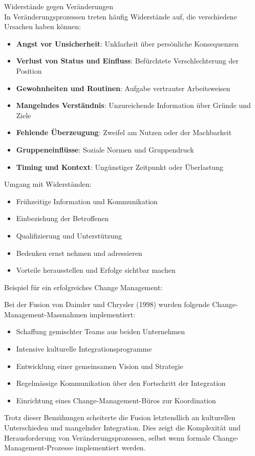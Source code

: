 \begin{concept}{Widerstände gegen Veränderungen}\\
In Veränderungsprozessen treten häufig Widerstände auf, die verschiedene Ursachen haben können:
\begin{itemize}
    \item \textbf{Angst vor Unsicherheit}: Unklarheit über persönliche Konsequenzen
    \item \textbf{Verlust von Status und Einfluss}: Befürchtete Verschlechterung der Position
    \item \textbf{Gewohnheiten und Routinen}: Aufgabe vertrauter Arbeitsweisen
    \item \textbf{Mangelndes Verständnis}: Unzureichende Information über Gründe und Ziele
    \item \textbf{Fehlende Überzeugung}: Zweifel am Nutzen oder der Machbarkeit
    \item \textbf{Gruppeneinflüsse}: Soziale Normen und Gruppendruck
    \item \textbf{Timing und Kontext}: Ungünstiger Zeitpunkt oder Überlastung
\end{itemize}

Umgang mit Widerständen:
\begin{itemize}
    \item Frühzeitige Information und Kommunikation
    \item Einbeziehung der Betroffenen
    \item Qualifizierung und Unterstützung
    \item Bedenken ernst nehmen und adressieren
    \item Vorteile herausstellen und Erfolge sichtbar machen
\end{itemize}
\end{concept}

\begin{example}
Beispiel für ein erfolgreiches Change Management:

Bei der Fusion von Daimler und Chrysler (1998) wurden folgende Change-Management-Massnahmen implementiert:
\begin{itemize}
    \item Schaffung gemischter Teams aus beiden Unternehmen
    \item Intensive kulturelle Integrationsprogramme
    \item Entwicklung einer gemeinsamen Vision und Strategie
    \item Regelmässige Kommunikation über den Fortschritt der Integration
    \item Einrichtung eines Change-Management-Büros zur Koordination
\end{itemize}

Trotz dieser Bemühungen scheiterte die Fusion letztendlich an kulturellen Unterschieden und mangelnder Integration. Dies zeigt die Komplexität und Herausforderung von Veränderungsprozessen, selbst wenn formale Change-Management-Prozesse implementiert werden.
\end{example}

